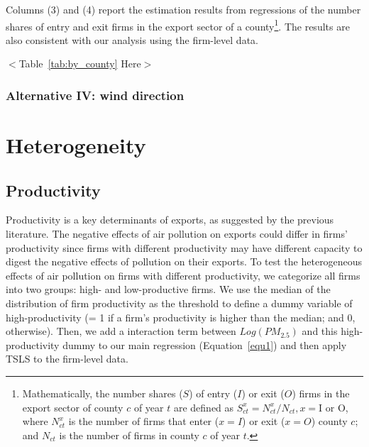 \documentclass[12pt]{article}
\begin{document}
  Columns (3) and (4) report the estimation results from regressions of the number shares of entry and exit firms in the export sector of a county\footnote{Mathematically, the number shares ($S$) of entry ($I$) or exit ($O$) firms in the export sector of county $c$ of year $t$ are defined as $S^x_{ct} = N^x_{ct}/N_{ct}, x = \text{I or O}$, where $N^x_{ct}$ is the number of firms that enter ($x = I$) or exit ($x = O$) county  $c$; and $N_{ct}$ is the number of firms in county $c$ of year $t$.}. The results are also consistent with our analysis using the firm-level data. 
 \begin{center}
  $<$Table~\ref{tab:by_county} Here$>$
  \end{center}

 \subsubsection{Alternative IV: wind direction} \label{sec:5.1.1}

 \section{Heterogeneity} \label{sec:5}

 \subsection{Productivity} \label{sec:5.2.1}
 Productivity is a key determinants of exports, as suggested by the previous literature. The negative effects of air pollution on exports could differ in firms' productivity since firms with different productivity may have different capacity to digest the negative effects of pollution on their exports. To test the heterogeneous effects of air pollution on firms with different productivity, we categorize all firms into two groups: high- and low-productive firms. We use the median of the distribution of firm productivity as the threshold to define a dummy variable of high-productivity (= 1 if a firm's productivity is higher than the median; and 0, otherwise). Then, we add a interaction term between $Log(PM_{2.5})$ and this high-productivity dummy to our main regression (Equation~\ref{equ1}) and then apply TSLS to the firm-level data. 
\end{document}
